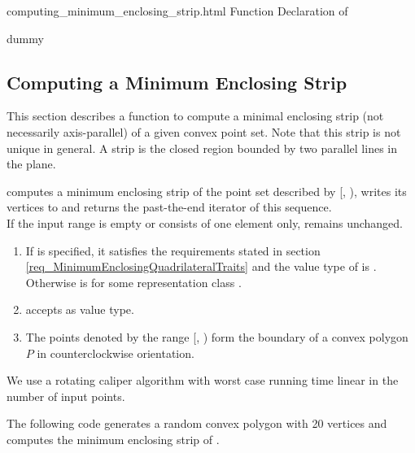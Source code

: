 \ccHtmlNoClassToc
\begin{ccHtmlClassFile}{computing_minimum_enclosing_strip.html}
  {Function Declaration of }
  \ccHtmlNoClassIndex\ccHtmlNoClassLinks
  \begin{ccClass}{dummy}
    \ccHtmlNoIndex\subsection{Computing a Minimum Enclosing Strip}
  \label{secMinimumEnclosingStrip}
  \end{ccClass}
  
  This section describes a function to compute a minimal enclosing
  strip (not necessarily axis-parallel) of a given convex point set.
  Note that this strip is not unique in general. A strip is the closed
  region bounded by two parallel lines in the plane.


  \def\ccLongParamLayout{\ccTrue} 
  
  
  computes a minimum enclosing strip of the point set described by
  [, ), writes its vertices to
   and returns the past-the-end iterator of this sequence.\\
  If the input range is empty or consists of one element only, 
  remains unchanged.
  
  \begin{enumerate}
  \item If  is specified, it satisfies the requirements
    stated in section \ref{req_MinimumEnclosingQuadrilateralTraits}
    and the value type  of  is
    . Otherwise  is
     for some representation class .
  \item {} accepts  as value type.
  \item The points denoted by the range [,
    ) form the boundary of a convex polygon $P$ in
    counterclockwise orientation.
  \end{enumerate}
  
  \ccImplementation We use a rotating caliper algorithm
  \cite{t-sgprc-83} with worst case running time linear in the number
  of input points.
    
  \ccExample The following code generates a random convex polygon
   with 20 vertices and computes the minimum enclosing
  strip of .


\end{ccHtmlClassFile}
    
